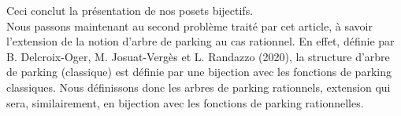 Ceci conclut la présentation de nos posets bijectifs.\\

Nous passons maintenant au second problème traité par cet article, à savoir
l'extension de la notion d'arbre de parking au cas rationnel.
En effet, définie par B. Delcroix-Oger, M. Josuat-Vergès et L. Randazzo
(2020), la structure d'arbre de parking (classique) est définie par une
bijection avec les fonctions de parking classiques.
Nous définissons donc les arbres de parking rationnels, extension qui sera,
similairement, en bijection avec les fonctions de parking rationnelles.